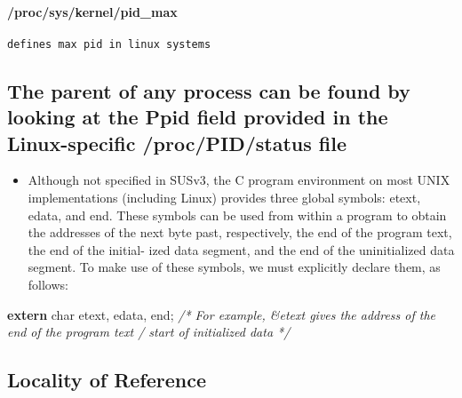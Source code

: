 \documentclass[
]{article}
\author{}
\date{}
\newenvironment{Shaded}{}{}
\newcommand{\CommentTok}[1]{\textcolor[rgb]{0.38,0.63,0.69}{\textit{#1}}}
\newcommand{\DataTypeTok}[1]{\textcolor[rgb]{0.56,0.13,0.00}{#1}}
\newcommand{\KeywordTok}[1]{\textcolor[rgb]{0.00,0.44,0.13}{\textbf{#1}}}
\newcommand{\NormalTok}[1]{#1}
\newcommand{\OperatorTok}[1]{\textcolor[rgb]{0.40,0.40,0.40}{#1}}
\providecommand{\tightlist}{%
  \setlength{\itemsep}{0pt}\setlength{\parskip}{0pt}}
\begin{document}
\hypertarget{procsyskernelpid_max}{%
\paragraph{/proc/sys/kernel/pid\_max}\label{procsyskernelpid_max}}

\begin{verbatim}
defines max pid in linux systems
\end{verbatim}

\hypertarget{the-parent-of-any-process-can-be-found-by-looking-at-the-ppid-field-provided-in-the-linux-specific-procpidstatus-file}{%
\subsection{The parent of any process can be found by looking at the
Ppid field provided in the Linux-specific /proc/PID/status
file}\label{the-parent-of-any-process-can-be-found-by-looking-at-the-ppid-field-provided-in-the-linux-specific-procpidstatus-file}}

\begin{itemize}
\tightlist
\item
  Although not specified in SUSv3, the C program environment on most
  UNIX implementations (including Linux) provides three global symbols:
  etext, edata, and end. These symbols can be used from within a program
  to obtain the addresses of the next byte past, respectively, the end
  of the program text, the end of the initial- ized data segment, and
  the end of the uninitialized data segment. To make use of these
  symbols, we must explicitly declare them, as follows:
\end{itemize}

\begin{Shaded}
\begin{Highlighting}[]
\KeywordTok{extern} \DataTypeTok{char}\NormalTok{ etext}\OperatorTok{,}\NormalTok{ edata}\OperatorTok{,}\NormalTok{ end}\OperatorTok{;}
        \CommentTok{/* For example, \&etext gives the address of the end}
\CommentTok{           of the program text / start of initialized data */}
\end{Highlighting}
\end{Shaded}

\hypertarget{locality-of-reference}{%
\subsection{Locality of Reference}\label{locality-of-reference}}
\end{document}
